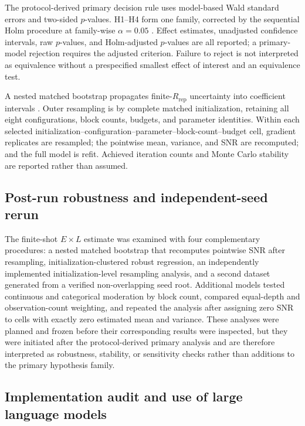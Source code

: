 \documentclass[pdflatex,sn-basic,Numbered]{sn-jnl}
\begin{document}
The protocol-derived primary decision rule uses model-based Wald standard errors and two-sided $p$-values. H1--H4 form one family, corrected by the sequential Holm procedure at family-wise $\alpha=0.05$ \cite{holm1979sequential}. Effect estimates, unadjusted confidence intervals, raw $p$-values, and Holm-adjusted $p$-values are all reported; a primary-model rejection requires the adjusted criterion. Failure to reject is not interpreted as equivalence without a prespecified smallest effect of interest and an equivalence test.

A nested matched bootstrap propagates finite-$R_{\mathrm{rep}}$ uncertainty into coefficient intervals \cite{davison1997bootstrap}. Outer resampling is by complete matched initialization, retaining all eight configurations, block counts, budgets, and parameter identities. Within each selected initialization--configuration--parameter--block-count--budget cell, gradient replicates are resampled; the pointwise mean, variance, and SNR are recomputed; and the full model is refit. Achieved iteration counts and Monte Carlo stability are reported rather than assumed.


\subsection{Post-run robustness and independent-seed rerun}\label{sec:h2-depth-methods}

The finite-shot $E\times L$ estimate was examined with four complementary procedures: a nested matched bootstrap that recomputes pointwise SNR after resampling, initialization-clustered robust regression, an independently implemented initialization-level resampling analysis, and a second dataset generated from a verified non-overlapping seed root. Additional models tested continuous and categorical moderation by block count, compared equal-depth and observation-count weighting, and repeated the analysis after assigning zero SNR to cells with exactly zero estimated mean and variance. These analyses were planned and frozen before their corresponding results were inspected, but they were initiated after the protocol-derived primary analysis and are therefore interpreted as robustness, stability, or sensitivity checks rather than additions to the primary hypothesis family.

\subsection{Implementation audit and use of large language models}
\end{document}
